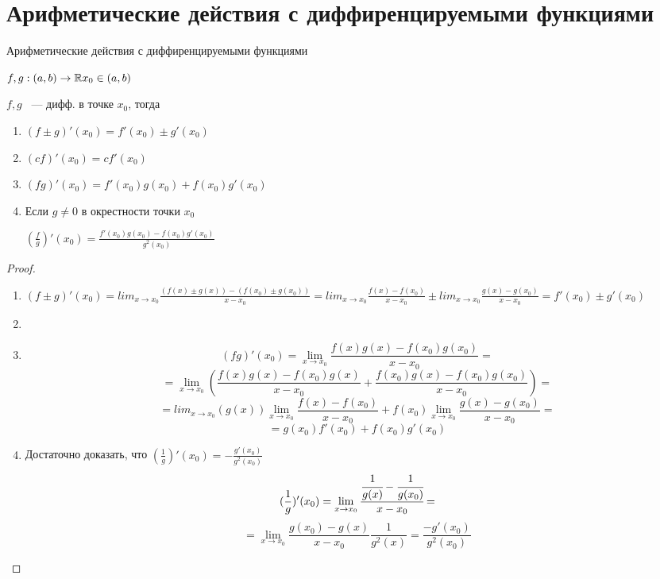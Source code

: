 ﻿\section{Арифметические действия с диффиренцируемыми функциями}

\begin{theorem}{Арифметические действия с диффиренцируемыми функциями}

$f, g:(a, b) \to \mathbb{R} x_0 \in(a, b)$

$f, g$ ~--- дифф. в точке $x_0$, тогда

\begin{enumerate}
    \item $(f\pm g)'(x_0) = f'(x_0) \pm g'(x_0)$
    \item $(cf)'(x_0) = cf'(x_0)$
    \item $(fg)'(x_0) = f'(x_0)g(x_0) + f(x_0)g'(x_0)$
    \item Если $g \ne 0$ в окрестности точки  $x_0$

    $(\frac{f}{g})'(x_0) = \frac{f'(x_0)g(x_0) - f(x_0)g'(x_0)}{g^2(x_0)}$  
\end{enumerate}
\end{theorem}

\begin{proof}
\begin{enumerate}
    \item $(f \pm g)'(x_0) = lim_{x \to x_0}\frac{(f(x) \pm g(x)) - (f(x_0) \pm g(x_0))}{x - x_0}
     = lim_{x \to x_0} \frac{f(x) - f(x_0)}{x - x_0} \pm lim_{x \to x_0} \frac{g(x) - g(x_0)}{x - x_0} = f'(x_0) \pm g'(x_0)$
    \item 
    \item $$(fg)'(x_0) = \lim_{x \to x_0}\frac{f(x)g(x) - f(x_0)g(x_0)}{x - x_0} = $$
    $$ = \lim_{x \to x_0} (\frac{f(x)g(x) - f(x_0)g(x)}{x - x_0} + \frac{f(x_0)g(x) - f(x_0)g(x_0)}{x - x_0}) =$$
    $$= lim_{x \to x_0}(g(x)) \lim_{x \to x_0}{\frac{f(x) - f(x_0)}{x - x_0}} + f(x_0)\lim_{x \to x_0}{\frac{g(x) - g(x_0)}{x - x_0}} = $$
    $$= g(x_0)f'(x_0) + f(x_0)g'(x_0)$$
    \item Достаточно доказать, что $(\frac1g)'(x_0) = -\frac{g'(x_0)}{g^2(x_0)}$
    $$(\frac{1}{g})'(x_0) = \lim_{x \to x_0}\cfrac{\cfrac{1}{g(x)} - \cfrac{1}{g(x_0)}}{x - x_0} = $$
    $$=\lim_{x \to x_0}\frac{g(x_0) - g(x)}{x - x_0}\frac{1}{g^2(x)} = \frac{-g'(x_0)}{g^2(x_0)} $$ 
\end{enumerate}
\end{proof}